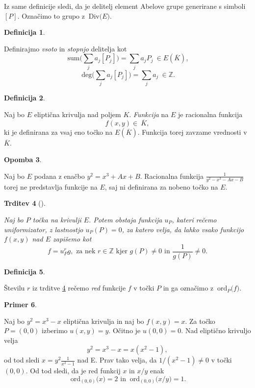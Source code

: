 \documentclass[12pt,a4paper,twoside]{article}
\theoremstyle{definition} %
\newtheorem{definicija}{Definicija}[section]
\newtheorem{primer}[definicija]{Primer}
\newtheorem{opomba}[definicija]{Opomba}
\theoremstyle{plain} %
\newtheorem{trditev}[definicija]{Trditev}
\numberwithin{equation}{section}  %
\newcommand{\Z}{\mathbb Z}
\newcommand{\E}[1]{E({#1})}
\newcommand{\DIV}[1]{\ \text{Div(}{#1}\text{)}}
\newcommand{\DEG}[1]{\ \text{deg(}{#1}\text{)}}
\newcommand{\SUM}[1]{\ \text{sum(}{#1}\text{)}}
\newcommand{\ORDp}[2]{\ \text{ord}_{#2}({#1}\text{)}}
\begin{document}
Iz same definicije sledi, da je delitelj element Abelove grupe generirane s simboli $[P]$. Označimo to grupo z $\DIV{E}$.


\begin{definicija}~

Definirajmo \emph{vsoto} in \emph{stopnjo} delitelja kot
$$\SUM{\sum_{j}a_j[P_j]} = \sum_ja_jP_j \ \in \E{\overline{K}},$$
$$\DEG{\sum_{j}a_j[P_j]} = \sum_ja_j \ \in \Z.$$

\end{definicija}


\begin{definicija}~

Naj bo $E$ eliptična krivulja nad poljem $K$. \emph{Funkcija} na $E$ je racionalna funkcija $$f(x,y) \in \ \overline{K},$$ ki je definirana za vsaj eno točko na $\E{\overline{K}}$. Funkcija torej zavzame vrednosti v $\overline{K}$.
\end{definicija}

\begin{opomba}~

Naj bo $E$ podana z enačbo $y^2 = x^3+Ax+B$. Racionalna funkcija $\frac{1}{y^2-x^3-Ax-B}$ torej ne predstavlja funkcije na $E$, saj ni definirana za nobeno točko na $E$.

\end{opomba}

\begin{trditev}[]~
\label{trd:red}

Naj bo $P$ točka na krivulji $E$. Potem obstaja funkcija $u_P$, kateri rečemo uniformizator, z lastnostjo $u_P(P) = 0$, za katero velja, da lahko vsako funkcijo $f(x,y)$ nad $E$ zapišemo kot
$$f = u^r_Pg, \text{ za nek } r\in \Z \text{ kjer } g(P) \neq 0 \text{ in } \frac{1}{g(P)} \neq 0.$$
\end{trditev}

\begin{definicija}~

Številu $r$ iz trditve \ref{trd:red} rečemo \emph{red} funkcije $f$ v točki $P$ in ga označimo z $\ORDp{f}{P}$.
\end{definicija}

\begin{primer}~

Naj bo $y^2 = x^3-x$ eliptična krivulja in naj bo $f(x,y) = x$. Za točko $P = (0,0)$ izberimo $u(x,y) = y$. Očitno je $u(0,0) = 0$. Nad eliptično krivuljo velja 
$$y^2 = x^3-x = x(x^2-1),$$ 
od tod sledi $x = y^2\frac{1}{x^2-1}$ nad E.
Prav tako velja, da $1/(x^2-1) \neq 0$ v točki $(0,0)$. Od tod sledi, da je red funkcij $x$ in $x/y$ enak
$$\ORDp{x}{(0,0)} = 2\text{ in }  \ORDp{x/y}{(0,0)}= 1.$$
\end{primer}
\end{document}
